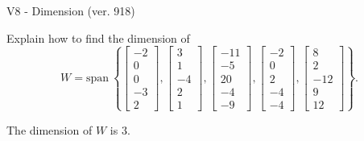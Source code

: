 \begin{exercise}
  \begin{exerciseTitle}V8 - Dimension (ver. 918)\end{exerciseTitle}
  \begin{exerciseStatement}
    Explain how to find the dimension of 
\[W=\mathrm{span}\ \left\{\left[\begin{array}{r}
-2 \\
0 \\
0 \\
-3 \\
2
\end{array}\right] , \left[\begin{array}{r}
3 \\
1 \\
-4 \\
2 \\
1
\end{array}\right] , \left[\begin{array}{r}
-11 \\
-5 \\
20 \\
-4 \\
-9
\end{array}\right] , \left[\begin{array}{r}
-2 \\
0 \\
2 \\
-4 \\
-4
\end{array}\right] , \left[\begin{array}{r}
8 \\
2 \\
-12 \\
9 \\
12
\end{array}\right]\right\}.\]



  \end{exerciseStatement}
  \begin{exerciseAnswer}
   The dimension of \(W\) is  \(3\).
  


  \end{exerciseAnswer}
\end{exercise}